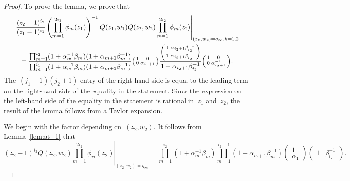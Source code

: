 \documentclass[11pt]{article}
\theoremstyle{plain}
\theoremstyle{definition}
\numberwithin{equation}{section}
\begin{document}
\begin{proof}
To prove the lemma, we prove that
\begin{multline}\label{eq:at_1_full}
\left.\frac{(z_2-1)^{i_2}}{(z_1-1)^{i_1}}\left(\prod_{m=1}^{2i_1}\phi_m(z_1)\right)^{-1}Q(z_1,w_1)Q(z_2,w_2)\prod_{m=1}^{2i_2}\phi_m(z_2)\right|_{(z_k,w_k)=q_\infty, k=1,2} \\
=\frac{\prod_{m=1}^{i_2}(1+\alpha_m^{-1}\beta_m)(1+\alpha_{m+1}\beta_m^{-1})}
{\prod_{m=1}^{i_1}(1+\alpha_m^{-1}\beta_m)(1+\alpha_{m+1}\beta_m^{-1})}
\begin{psmallmatrix}
1 & 0 \\
0 & \alpha_{i_1+1}
\end{psmallmatrix}
\frac{
\begin{psmallmatrix}
1 & \alpha_{i_2+1}\beta_{i_2}^{-1} \\
1 & \alpha_{i_2+1}\beta_{i_2}^{-1}
\end{psmallmatrix}}
{1+\alpha_{i_2+1}\beta_{i_2}^{-1}}
\begin{psmallmatrix}
1 & 0 \\
0 & \alpha_{i_2+1}^{-1}
\end{psmallmatrix}.
\end{multline}
The~$(j_1+1)(j_2+1)$-entry of the right-hand side is equal to the leading term on the right-hand side of the equality in the statement. Since the expression on the left-hand side of the equality in the statement is rational in~$z_1$ and~$z_2$, the result of the lemma follows from a Taylor expansion.

We begin with the factor depending on~$(z_2,w_2)$. It follows from Lemma~\ref{lem:at_1} that
\begin{equation}\label{eq:at_1_factor_1}
\left.(z_2-1)^{i_2}Q(z_2,w_2)\prod_{m=1}^{2i_2}\phi_m(z_2)\right|_{(z_2,w_2)=q_\infty}=
\prod_{m=1}^{i_2}(1+\alpha_m^{-1}\beta_m)\prod_{m=1}^{i_2-1}(1+\alpha_{m+1}\beta_m^{-1})
\begin{pmatrix}
1 \\
\alpha_{1}
\end{pmatrix}
\begin{pmatrix}
1 & \beta_{i_2}^{-1}
\end{pmatrix}.
\end{equation}


\end{proof}
\end{document}
